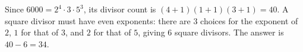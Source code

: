 Since $6000=2^4\cdot3\cdot5^3$, its divisor count is $(4+1)(1+1)(3+1)=40$. A square divisor must have even exponents: there are $3$ choices for the exponent of $2$, $1$ for that of $3$, and $2$ for that of $5$, giving $6$ square divisors. The answer is $\boxed{40-6=34}$.
